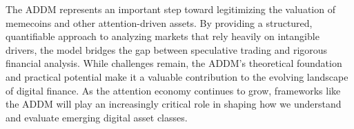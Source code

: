 \documentclass[a4paper,12pt]{article}
\begin{document}
The ADDM represents an important step toward legitimizing the valuation of memecoins and other attention-driven assets. By providing a structured, quantifiable approach to analyzing markets that rely heavily on intangible drivers, the model bridges the gap between speculative trading and rigorous financial analysis. While challenges remain, the ADDM’s theoretical foundation and practical potential make it a valuable contribution to the evolving landscape of digital finance. As the attention economy continues to grow, frameworks like the ADDM will play an increasingly critical role in shaping how we understand and evaluate emerging digital asset classes.
\end{document}
